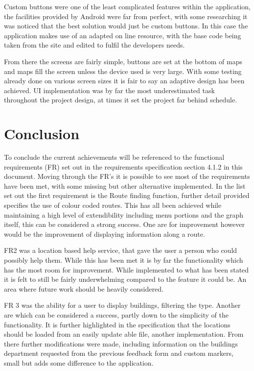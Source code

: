 Custom buttons were one of the least complicated features within the application, the facilities provided by Android were far from perfect, with some researching it was noticed that the best solution would just be custom buttons. In this case the application makes use of an adapted on line resource\cite{button}, with the base code being taken from the site and edited to fulfil the developers needs. 

From there the screens are fairly simple, buttons are set at the bottom of maps and maps fill the screen unless the device used is very large. With some testing already done on various screen sizes it is fair to say an adaptive design has been achieved. UI implementation was by far the most underestimated task throughout the project design, at times it set the project far behind schedule. 
\section{Conclusion}
To conclude the current achievements will be referenced to the functional requirements (FR) set out in the requirements specification section 4.1.2 in this document. Moving through the FR's it is possible to see most of the requirements have been met, with some missing but other alternative implemented. In the list set out the first requirement is the Route finding function, further detail provided specifies the use of colour coded routes. This has all been achieved while maintaining a high level of extendibility including menu portions and the graph itself, this can be considered a strong success. One are for improvement however would be the improvement of displaying information along a route. 

FR2 was a location based help service, that gave the user a person who could possibly help them. While this has been met it is by far the functionality which has the most room for improvement. While implemented to what has been stated it is felt to still be fairly underwhelming compared to the feature it could be. An area where future work should be heavily considered.

FR 3 was the ability for a user to display buildings, filtering the type. Another are which can be considered a success, partly down to the simplicity of the functionality. It is further highlighted in the specification that the locations should be loaded from an easily update able file, another implementation. From there further modifications were made, including information on the buildings department requested from the previous feedback form and custom markers, small but adds some difference to the application. 

